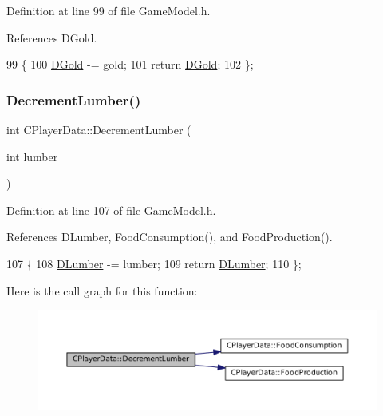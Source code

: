Definition at line 99 of file Game\+Model.\+h.



References D\+Gold.


\begin{DoxyCode}
99                                    \{
100             \hyperlink{classCPlayerData_afa66ff31262c9b287ae8c13259aae6f3}{DGold} -= gold;
101             \textcolor{keywordflow}{return} \hyperlink{classCPlayerData_afa66ff31262c9b287ae8c13259aae6f3}{DGold};   
102         \};
\end{DoxyCode}
\hypertarget{classCPlayerData_a0c79b0b958333fc52b1de5ec93c01ede}{}\label{classCPlayerData_a0c79b0b958333fc52b1de5ec93c01ede} 
\subsubsection{\texorpdfstring{Decrement\+Lumber()}{DecrementLumber()}}
{\footnotesize\ttfamily int C\+Player\+Data\+::\+Decrement\+Lumber (\begin{DoxyParamCaption}\item[{int}]{lumber }\end{DoxyParamCaption})\hspace{0.3cm}{\ttfamily [inline]}}



Definition at line 107 of file Game\+Model.\+h.



References D\+Lumber, Food\+Consumption(), and Food\+Production().


\begin{DoxyCode}
107                                        \{
108             \hyperlink{classCPlayerData_adf3bf2fa49b5c8a4fb9a478d95f688c4}{DLumber} -= lumber;
109             \textcolor{keywordflow}{return} \hyperlink{classCPlayerData_adf3bf2fa49b5c8a4fb9a478d95f688c4}{DLumber};  
110         \};
\end{DoxyCode}
Here is the call graph for this function\+:\nopagebreak
\begin{figure}[H]
\begin{center}
\leavevmode
\includegraphics[width=350pt]{classCPlayerData_a0c79b0b958333fc52b1de5ec93c01ede_cgraph}
\end{center}
\end{figure}
\hypertarget{classCPlayerData_a24f56e033f6d68ceba0f876d854201f0}{}\label{classCPlayerData_a24f56e033f6d68ceba0f876d854201f0} 
